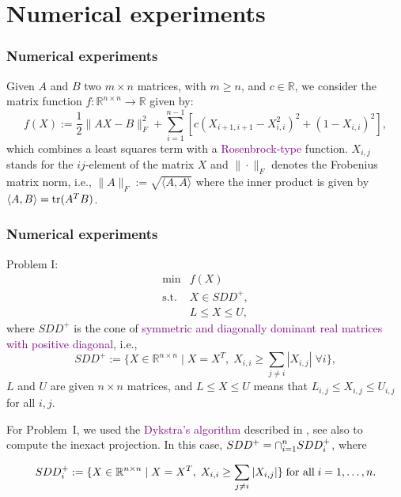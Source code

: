 \section{Numerical experiments}

\begin{frame}[t]\frametitle{Numerical experiments}
	Given $A$ and $B$ two $m\times n$ matrices, with $m\geq n$, and $c\in\mathbb{R}$, we consider the matrix function $f:\mathbb{R}^{n\times n}\to\mathbb{R}$ given by:
	$$f(X):=\dfrac{1}{2}\|AX-B\|^2_F + \sum_{i=1}^{n-1} \left[ c \left( X_{i+1,i+1}-X_{i,i}^2 \right)^2 + (1-X_{i,i})^2   \right],$$
	which combines a least squares term with a \textcolor{purple}{Rosenbrock-type} function. $X_{i,j}$ stands for the $ij$-element of the matrix $X$ and $\|\cdot\|_F$ denotes the Frobenius matrix norm, i.e., $\|A\|_F:=\sqrt{\langle A,A \rangle}$ where the inner product is given by $\langle A,B \rangle = \textrm{tr}(A^TB)$.
\end{frame}


\begin{frame}[t]\frametitle{Numerical experiments}
	\begin{block}{Problem I:}
		\begin{equation*}
			\begin{array}{cl}
				\displaystyle\min & f(X)           \\
				\mbox{s.t.}       & X \in SDD^+,   \\
				                  & L\leq X\leq U,
			\end{array}
		\end{equation*}
		where $SDD^+$ is the cone of \textcolor{purple}{symmetric and diagonally dominant real matrices with positive diagonal}, i.e.,
		\begin{equation}
			SDD^+ :=\{X\in\mathbb{R}^{n\times n}\mid X=X^T, \; X_{i,i}\geq \displaystyle\sum_{j\neq i}|X_{i,j}| \; \forall i\},
		\end{equation}
		$L$ and $U$ are given $n\times n$ matrices, and  $L\leq X\leq U$ means that $L_{i,j} \leq X_{i,j} \leq U_{i,j}$ for all $i,j$.
	\end{block}

	For Problem~I, we used the \textcolor{purple}{Dykstra's algorithm} described in \cite{BirginMartinezRaydan2003}, see also \cite{dykstraSDD} to compute the inexact projection. In this case, $SDD^+=\displaystyle\cap_{i=1}^n SDD^+_i$, where

	\begin{equation}
		SDD^+_i :=\{X\in\mathbb{R}^{n\times n}\mid X=X^T, \; X_{i,i}\geq \displaystyle\sum_{j\neq i}|X_{i,j}| \} \; \mbox{for all} \; i=1,\ldots,n.
	\end{equation}
\end{frame}


